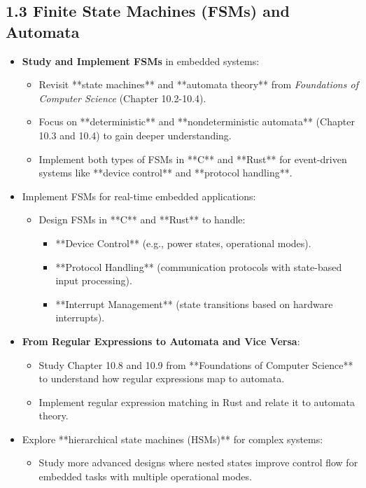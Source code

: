 \documentclass{article}
\begin{document}
\subsection*{1.3 Finite State Machines (FSMs) and Automata}
\begin{itemize}
    \item \textbf{Study and Implement FSMs} in embedded systems:
    \begin{itemize}
        \item Revisit **state machines** and **automata theory** from \textit{Foundations of Computer Science} (Chapter 10.2-10.4).
        \item Focus on **deterministic** and **nondeterministic automata** (Chapter 10.3 and 10.4) to gain deeper understanding.
        \item Implement both types of FSMs in **C** and **Rust** for event-driven systems like **device control** and **protocol handling**.
    \end{itemize}
    \item Implement FSMs for real-time embedded applications:
    \begin{itemize}
        \item Design FSMs in **C** and **Rust** to handle:
        \begin{itemize}
            \item **Device Control** (e.g., power states, operational modes).
            \item **Protocol Handling** (communication protocols with state-based input processing).
            \item **Interrupt Management** (state transitions based on hardware interrupts).
        \end{itemize}
    \end{itemize}
    \item \textbf{From Regular Expressions to Automata and Vice Versa}:
    \begin{itemize}
        \item Study Chapter 10.8 and 10.9 from **Foundations of Computer Science** to understand how regular expressions map to automata.
        \item Implement regular expression matching in Rust and relate it to automata theory.
    \end{itemize}
    \item Explore **hierarchical state machines (HSMs)** for complex systems:
    \begin{itemize}
        \item Study more advanced designs where nested states improve control flow for embedded tasks with multiple operational modes.
    \end{itemize}
\end{itemize}
\end{document}
